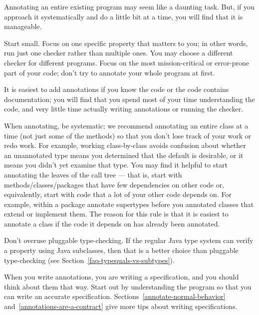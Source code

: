 
Annotating an entire existing program may seem like a daunting task.  But,
if you approach it systematically and do a little bit at a time, you will
find that it is manageable.


Start small.  Focus on one specific property that matters to you; in
other words, run just one checker rather than multiple ones.  You may
choose a different checker for different programs.
Focus on
the most mission-critical or error-prone part of your code; don't try to
annotate your whole program at first.

It is easiest to add annotations if you know the code or the
code contains documentation; you will find that you spend most of your time
understanding the code, and very little time actually writing annotations
or running the checker.

When annotating, be systematic; we recommend
annotating an entire class at a time (not just some of the methods)
so that you don't lose track of your work or redo work.  For example,
working class-by-class avoids confusion about whether an unannotated type
means you determined that the default is desirable, or it means you didn't
yet examine that type.
You may find it helpful to start annotating the leaves of the call tree ---
that is,
start with methods/classes/packages that have few dependencies on other
code or, equivalently, start with code that a lot of your other code
depends on.  For example, within a package annotate supertypes before you
annotated classes that extend or implement them.
The reason for this rule is that it is
easiest to annotate a class if the code it depends on has already been
annotated.

Don't overuse pluggable type-checking.  If the regular Java type system can
verify a property using Java subclasses, then that is a better choice than
pluggable type-checking (see Section~\ref{faq-typequals-vs-subtypes}).



When you write annotations, you are writing a specification, and you should
think about them that way.  Start out by understanding the program so that
you can write an accurate specification.
Sections~\ref{annotate-normal-behavior}
and~\ref{annotations-are-a-contract} give more tips about writing
specifications.


